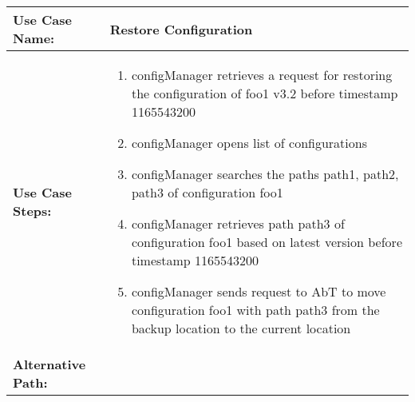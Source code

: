 
\begin{tabularx}{\linewidth}{|l|X|}
\hline
\textbf{Use Case Name:} & \textbf{Restore Configuration} \\
\hline
\textbf{Use Case Steps:} & 
\begin{minipage}{\linewidth} 
  \vspace{0.05em}
  \begin{enumerate}
	\item configManager retrieves a request for restoring the configuration of foo1 v3.2 before timestamp 1165543200  
	\item configManager opens list of configurations
	\item configManager searches the paths path1, path2, path3 of configuration foo1
	\item configManager retrieves path path3 of configuration foo1 based on latest version before timestamp 1165543200
	\item configManager sends request to AbT to move configuration foo1 with path path3 from the backup location to the current location
  \end{enumerate}
  \vspace{0.05em}
\end{minipage}
\\
\hline 
\textbf{Alternative Path:} &
\begin{minipage}{\linewidth}
  \vspace{0.05em} 
  \vspace{0.05em} 
\end{minipage}
\\
\hline
\end{tabularx}


